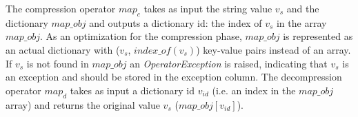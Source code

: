 The compression operator \(map_{c}\) takes as input the string value \(v_{s}\) and the dictionary \(map\_obj\) and outputs a dictionary id: the index of \(v_{s}\) in the array \(map\_obj\). As an optimization for the compression phase, \(map\_obj\) is represented as an actual dictionary with (\(v_{s}\), \(\mathit{index\_of}(v_{s})\)) key-value pairs instead of an array. If \(v_{s}\) is not found in \(map\_obj\) an \textit{OperatorException} is raised, indicating that \(v_{s}\) is an exception and should be stored in the exception column. The decompression operator \(map_{d}\) takes as input a dictionary id \(v_{id}\) (i.e. an index in the \(map\_obj\) array) and returns the original value \(v_{s}\) (\(map\_obj[v_{id}]\)).

